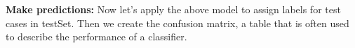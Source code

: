 \documentclass[]{article}
\newenvironment{Shaded}{\begin{snugshade}}{\end{snugshade}}
\newcommand{\CommentTok}[1]{\textcolor[rgb]{0.56,0.35,0.01}{\textit{#1}}}
\newcommand{\DecValTok}[1]{\textcolor[rgb]{0.00,0.00,0.81}{#1}}
\newcommand{\KeywordTok}[1]{\textcolor[rgb]{0.13,0.29,0.53}{\textbf{#1}}}
\newcommand{\NormalTok}[1]{#1}
\newcommand{\OperatorTok}[1]{\textcolor[rgb]{0.81,0.36,0.00}{\textbf{#1}}}
\newcommand{\StringTok}[1]{\textcolor[rgb]{0.31,0.60,0.02}{#1}}
\begin{document}
\textbf{Make predictions:} Now let's apply the above model to assign
labels for test cases in testSet. Then we create the confusion matrix, a
table that is often used to describe the performance of a classifier.

\begin{Shaded}
\end{Shaded}
\end{document}
